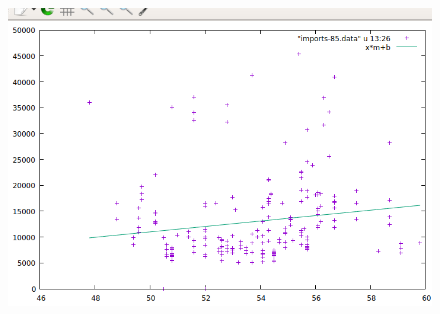 \documentclass[12pt,a4paper]{article}
\begin{document}
\begin{enumerate}
    \begin{figure}[h!]
        \centering
        \includegraphics[scale = 0.7]{4.3.PNG}
    \end{figure}

\end{enumerate}
\end{document}
